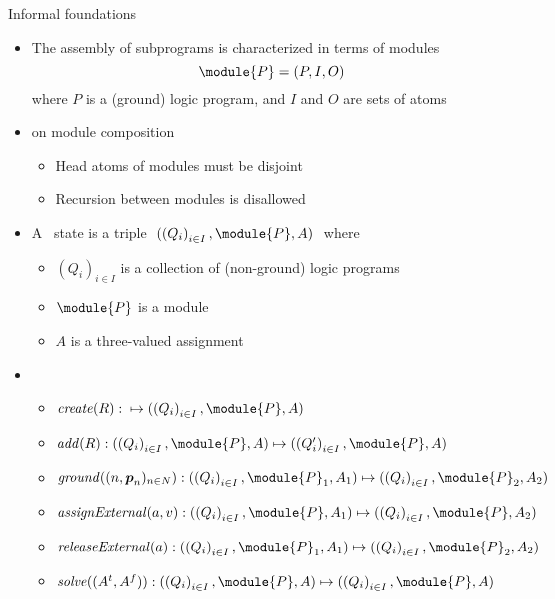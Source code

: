 \begin{frame}{Informal foundations}
  \medskip
  \begin{itemize}
  \item<only@1-2> The assembly of subprograms is characterized in terms of modules
    \[
      \module{P}=(P,I,O)
    \]
    where $P$ is a (ground) logic program, and $I$ and $O$ are sets of atoms
    \smallskip
  \item<only@1-2>  on module composition
    \begin{itemize}\normalsize
    \item Head atoms of modules must be disjoint
    \item Recursion between modules is disallowed
    \end{itemize}
    \medskip
  \item <2-> A \alert{\clingo\ state} is a triple
    \(
      \ ( \left(Q_i\right)_{i\in I},\module{P},A ) \
    \)
    where
    \begin{itemize}\normalsize
    \item $\left(Q_i\right)_{i\in I}$ is a collection of (non-ground) logic programs
    \item $\module{P}$ is a module
    \item $A$ is a three-valued assignment
    \end{itemize}
    \smallskip
  \item <only@3-> 
    \begin{itemize}
  \item $\mathit{create}(R): {} \mapsto ( \left(Q_i\right)_{i\in I},\module{P},A )$
  \item $\mathit{add}(R): ( \left(Q_i\right)_{i\in I},\module{P},A )\mapsto( \left(Q'_i\right)_{i\in I},\module{P},A )$
  \item $\mathit{ground}((n,\boldsymbol{p}_n)_{n\in N}): ( \left(Q_i\right)_{i\in I},\module{P}_1,A_1 )\mapsto(\left(Q_i\right)_{i\in I},\module{P}_2,A_2 )$
  \item $\mathit{assignExternal}(a,v): ( \left(Q_i\right)_{i\in I},\module{P},A_1 )\mapsto(\left(Q_i\right)_{i\in I},\module{P},A_2 )$
  \item $\mathit{releaseExternal}(a): ( \left(Q_i\right)_{i\in I},\module{P}_1,A_1 )\mapsto(\left(Q_i\right)_{i\in I},\module{P}_2 ,A_2 )$
  \item $\mathit{solve}(( A^t,A^f )): ( \left(Q_i\right)_{i\in I},\module{P},A )\mapsto( \left(Q_i\right)_{i\in I},\module{P},A )$
  \end{itemize}
\end{itemize}
\end{frame}
